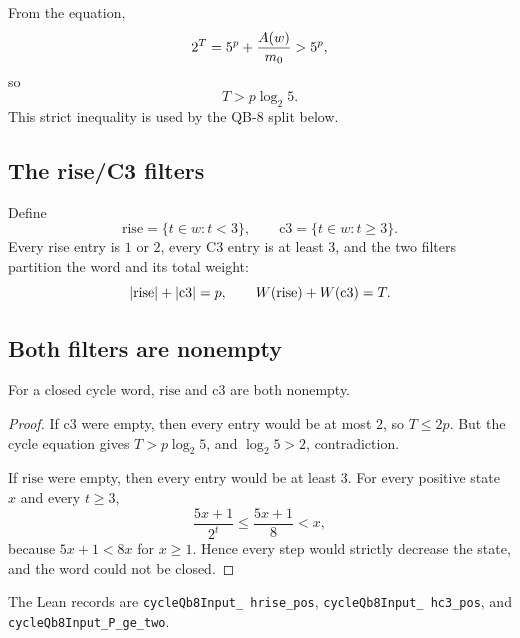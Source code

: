 From the equation,
\begin{equation*}
  2^T=5^p+\frac{A(w)}{m_0}>5^p,
\end{equation*}
so
\begin{equation*}
  T>p\log_2 5.
\end{equation*}
This strict inequality is used by the QB-8 split below.

\subsection{The rise/C3 filters}

Define
\begin{equation*}
  \mathrm{rise}=\{t\in w:t<3\},
  \qquad
  \mathrm{c3}=\{t\in w:t\ge3\}.
\end{equation*}
Every rise entry is $1$ or $2$, every C3 entry is at least $3$, and
the two filters partition the word and its total weight:
\begin{equation*}
  |\mathrm{rise}|+|\mathrm{c3}|=p,
  \qquad
  W(\mathrm{rise})+W(\mathrm{c3})=T.
\end{equation*}

\subsection{Both filters are nonempty}

\begin{proposition}
For a closed cycle word, $\mathrm{rise}$ and $\mathrm{c3}$ are both
nonempty.
\end{proposition}

\begin{proof}
If $\mathrm{c3}$ were empty, then every entry would be at most $2$,
so $T\le2p$.  But the cycle equation gives $T>p\log_2 5$, and
$\log_2 5>2$, contradiction.

If $\mathrm{rise}$ were empty, then every entry would be at least
$3$.  For every positive state $x$ and every $t\ge3$,
\begin{equation*}
  \frac{5x+1}{2^t}\le\frac{5x+1}{8}<x,
\end{equation*}
because $5x+1<8x$ for $x\ge1$.  Hence every step would strictly
decrease the state, and the word could not be closed.
\end{proof}

The Lean records are \texttt{cycleQb8Input\_\allowbreak
hrise\_\allowbreak pos}, \texttt{cycleQb8Input\_\allowbreak
hc3\_\allowbreak pos}, and
\texttt{cycleQb8Input\_\allowbreak P\_\allowbreak ge\_\allowbreak two}.

